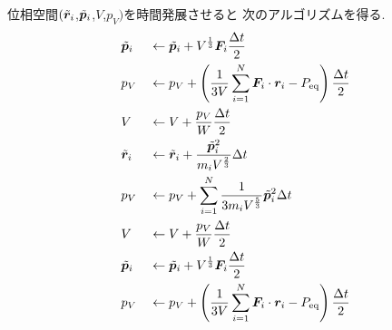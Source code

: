  位相空間$(\Tilde{\bm{r}}_{i}$,$\Tilde{\bm{p}}_{i}$,$V$,$p_{V})$を時間発展させると
 次のアルゴリズムを得る. 
\begin{alignat}{2}
 &\Tilde{\bm{p}}_{i} &&\gets \Tilde{\bm{p}}_{i}
                                 + V^{\frac{1}{3}} \bm{F}_{i} \frac{\Delta t}{2}
 \label{eq:Andersen21.1}
 \\
 &p_{V} &&\gets p_{V} + \left(
                                \frac{1}{3V} \sum_{i=1}^{N} \bm{F}_{i}
                                \cdot \bm{r}_{i} - P_{\mathrm{eq}}
                          \right) \frac{\Delta t}{2}
 \label{eq:Andersen21.2}
 \\
 &V &&\gets V + \frac{p_{V}}{W} \frac{\Delta t}{2}
 \label{eq:Andersen21.3}
 \\
 &\Tilde{\bm{r}}_{i} &&\gets \Tilde{\bm{r}}_{i}
                                   + \frac{\Tilde{\bm{p}}_{i}^{2}}{m_{i} V^{\frac{2}{3}}} \Delta t
 \label{eq:Andersen21.4}
 \\
 &p_{V} &&\gets p_{V} + \sum_{i=1}^{N} \frac{1}{3 m_{i} V^{\frac{5}{3}}}
                                         \Tilde{\bm{p}}_{i}^{2} \Delta t
 \label{eq:Andersen21.5}
 \\
 &V &&\gets V + \frac{p_{V}}{W} \frac{\Delta t}{2}
 \label{eq:Andersen21.6}
 \\
 &\Tilde{\bm{p}}_{i} &&\gets \Tilde{\bm{p}}_{i}
                            + V^{\frac{1}{3}} \bm{F}_{i} \frac{\Delta t}{2}
 \label{eq:Andersen21.4}
 \\
 &p_{V} &&\gets p_{V} + \left(
                                \frac{1}{3V} \sum_{i=1}^{N} \bm{F}_{i}
                                \cdot \bm{r}_{i} - P_{\mathrm{eq}}
                          \right) \frac{\Delta t}{2}
 \label{eq:Andersen21.5}
\end{alignat}




